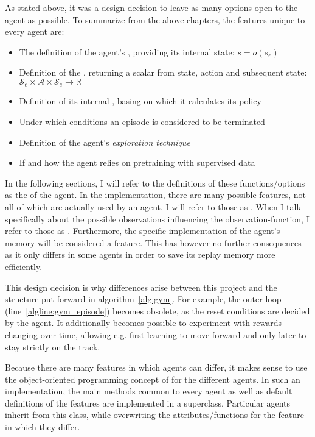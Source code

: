 As stated above, it was a design decision to leave as many options open to the agent as possible. To summarize from the above chapters, the features unique to every agent are:
\begin{itemize}
	\item The definition of the agent's , providing its internal state: $s = o(s_e)$
	\item Definition of the , returning a scalar from state, action and subsequent state: $\mathcal{S}_e \times \mathcal{A} \times \mathcal{S}_e \rightarrow \mathds{R}$
	\item Definition of its internal , basing on which it calculates its policy
	\item Under which conditions an episode is considered to be terminated 
	\item Definition of the agent's \textit{exploration technique}
	\item If and how the agent relies on pretraining with supervised data	
\end{itemize}
\begin{flushright}
	\scriptsize
	In the following sections, I will refer to the definitions of these functions/options as the  of the agent. In the implementation, there are many possible features, not all of which are actually used by an agent. I will refer to those as . When I talk specifically about the possible observations influencing the observation-function, I refer to those as . Furthermore, the specific implementation of the agent's memory will be considered a feature. This has however no further consequences as it only differs in some agents in order to save its replay memory more efficiently.
\end{flushright}

This design decision is why differences arise between this project and the structure put forward in algorithm~\ref{alg:gym}. For example, the outer loop (line~\ref{algline:gym_episode}) becomes obsolete, as the reset conditions are decided by the agent. It additionally becomes possible to experiment with rewards changing over time, allowing e.g. first learning to move forward and only later to stay strictly on the track.

Because there are many features in which agents can differ, it makes sense to use the object-oriented programming concept of  for the different agents. In such an implementation, the main methods common to every agent as well as default definitions of the features are implemented in a superclass. Particular agents inherit from this class, while overwriting the attributes/functions for the feature in which they differ.\\

